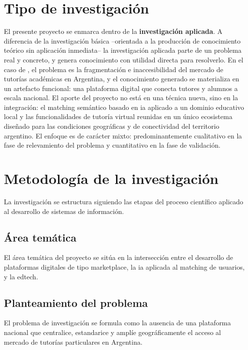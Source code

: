 \section{Tipo de investigación}

El presente proyecto se enmarca dentro de la \textbf{investigación
aplicada}. A diferencia de la investigación básica --orientada a la
producción de conocimiento teórico sin aplicación inmediata-- la
investigación aplicada parte de un problema real y concreto, y genera
conocimiento con utilidad directa para resolverlo. En el caso de
\sistema{}, el problema es la fragmentación e inaccesibilidad del
mercado de tutorías académicas en Argentina, y el conocimiento generado
se materializa en un artefacto funcional: una plataforma digital que
conecta tutores y alumnos a escala nacional. El aporte del proyecto no
está en una técnica nueva, sino en la integración: el \gls{matching}
semántico basado en \gls{ia} aplicado a un dominio educativo local y las
funcionalidades de tutoría virtual reunidas en un único ecosistema
diseñado para las condiciones geográficas y de conectividad del
territorio argentino.
El enfoque es de carácter mixto: predominantemente cualitativo en la
fase de relevamiento del problema y cuantitativo en la fase de
validación.

\section{Metodología de la investigación}

La investigación se estructura siguiendo las etapas del proceso
científico aplicado al desarrollo de sistemas de información.

\subsection{Área temática}

El área temática del proyecto se sitúa en la intersección entre el
desarrollo de plataformas digitales de tipo \gls{marketplace}, la \gls{ia}
aplicada al \gls{matching} de usuarios, y la \gls{edtech}.

\subsection{Planteamiento del problema}

El problema de investigación se formula como la ausencia de una
plataforma nacional que centralice, estandarice y amplíe
geográficamente el acceso al mercado de tutorías particulares en
Argentina.

